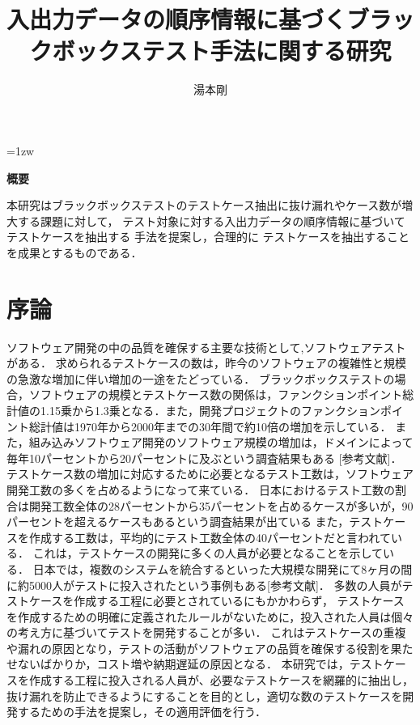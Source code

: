 \documentclass[a4paper,11pt]{jreport}
\title{入出力データの順序情報に基づくブラックボックステスト手法に関する研究}
\author{湯本剛}
\begin{document}
\maketitle
\thispagestyle{empty}
\newpage

\thispagestyle{empty}
\vspace*{20pt plus 1fil}
\parindent=1zw
\noindent
\begin{center}
{\bf 概要}
\vspace{5mm}
\end{center}
本研究はブラックボックステストのテストケース抽出に抜け漏れやケース数が増 大する課題に対して，
テスト対象に対する入出力データの順序情報に基づいてテストケースを抽出する 手法を提案し，合理的に
テストケースを抽出することを成果とするものである．
\par
\vspace{0pt plus 1fil}
\newpage

\tableofcontents
\listoffigures

\pagebreak \setcounter{page}{1}

\chapter{序論}
ソフトウェア開発の中の品質を確保する主要な技術として,ソフトウェアテストがある．
求められるテストケースの数は，昨今のソフトウェアの複雑性と規模の急激な増加に伴い増加の一途をたどっている．
ブラックボックステストの場合，ソフトウェアの規模とテストケース数の関係は，ファンクションポイント総計値の1.15乗から1.3乗となる\cite{jones1998estimating}．また，開発プロジェクトのファンクションポイント総計値は1970年から2000年までの30年間で約10倍の増加を示している\cite{longstreet2000}．
また，組み込みソフトウェア開発のソフトウェア規模の増加は，ドメインによって毎年10パーセントから20パーセントに及ぶという調査結果もある [参考文献]．
テストケース数の増加に対応するために必要となるテスト工数は，ソフトウェア開発工数の多くを占めるようになって来ている．
日本におけるテスト工数の割合は開発工数全体の28パーセントから35パーセントを占めるケースが多いが，90パーセントを超えるケースもあるという調査結果が出ている\cite{IPA2015}
また，テストケースを作成する工数は，平均的にテスト工数全体の40パーセントだと言われている\cite{van2013tpi}．
これは，テストケースの開発に多くの人員が必要となることを示している．
日本では，複数のシステムを統合するといった大規模な開発にて8ヶ月の間に約5000人がテストに投入されたという事例もある[参考文献]．
多数の人員がテストケースを作成する工程に必要とされているにもかかわらず， テストケースを作成するための明確に定義されたルールがないために，投入された人員は個々の考え方に基づいてテストを開発することが多い．
これはテストケースの重複や漏れの原因となり，テストの活動がソフトウェアの品質を確保する役割を果たせないばかりか，コスト増や納期遅延の原因となる．
本研究では，テストケースを作成する工程に投入される人員が、必要なテストケースを網羅的に抽出し，抜け漏れを防止できるようにすることを目的とし，適切な数のテストケースを開発するための手法を提案し，その適用評価を行う．
\end{document}
